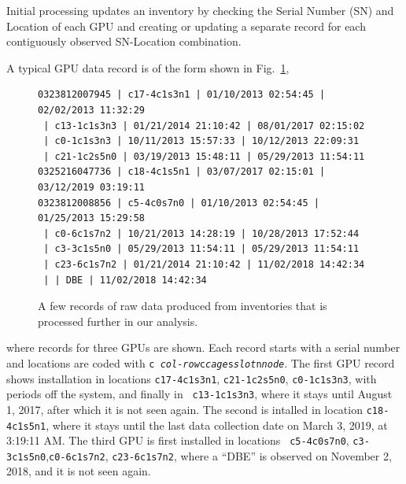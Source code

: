 Initial processing updates an inventory by checking the Serial Number
(SN) and Location of each GPU and creating or updating a separate
record for each contiguously observed SN-Location combination.


A typical GPU data record is of the form shown in Fig.~\ref{fig:dataraw},
\begin{figure}[tb]
{\tiny
\begin{verbatim}
0323812007945 | c17-4c1s3n1 | 01/10/2013 02:54:45 | 02/02/2013 11:32:29
 | c13-1c1s3n3 | 01/21/2014 21:10:42 | 08/01/2017 02:15:02
 | c0-1c1s3n3 | 10/11/2013 15:57:33 | 10/12/2013 22:09:31
 | c21-1c2s5n0 | 03/19/2013 15:48:11 | 05/29/2013 11:54:11
0325216047736 | c18-4c1s5n1 | 03/07/2017 02:15:01 | 03/12/2019 03:19:11
0323812008856 | c5-4c0s7n0 | 01/10/2013 02:54:45 | 01/25/2013 15:29:58
 | c0-6c1s7n2 | 10/21/2013 14:28:19 | 10/28/2013 17:52:44
 | c3-3c1s5n0 | 05/29/2013 11:54:11 | 05/29/2013 11:54:11
 | c23-6c1s7n2 | 01/21/2014 21:10:42 | 11/02/2018 14:42:34
 | | DBE | 11/02/2018 14:42:34
\end{verbatim}
}
\caption{A few records of raw data produced from inventories that is
  processed further in our analysis.}
\label{fig:dataraw}
\end{figure}
\noindent where records for three GPUs are shown. Each record starts
with a serial number and locations are coded with {\tt c{\it
    col-row}c{\it cage}s{\it slot}n{\it node}}. The first GPU record
shows installation in locations {\tt c17-4c1s3n1}, {\tt c21-1c2s5n0},
{\tt c0-1c1s3n3}, with periods off the system, and finally in {\tt
  c13-1c1s3n3}, where it stays until August 1, 2017, after which it is
not seen again. The second is intalled in location {\tt c18-4c1s5n1},
where it stays until the last data collection date on March 3, 2019,
at 3:19:11 AM. The third GPU is first installed in locations {\tt
  c5-4c0s7n0}, {\tt c3-3c1s5n0},{\tt c0-6c1s7n2}, {\tt c23-6c1s7n2},
where a ``DBE'' is observed on November 2, 2018, and it is not seen
again.
